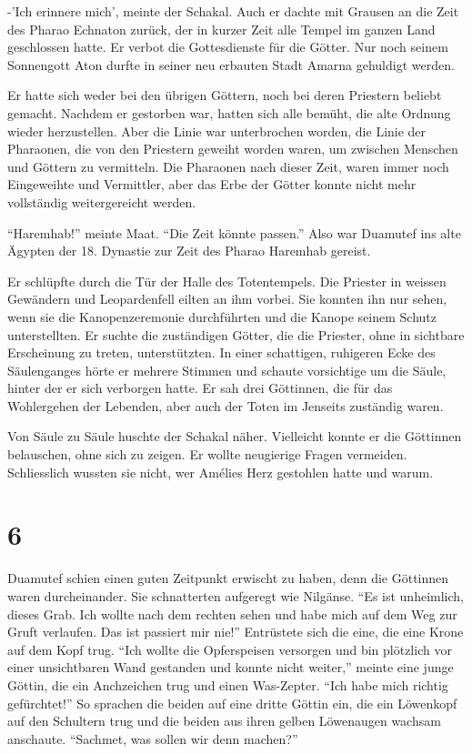 \documentclass[11pt,titlepage,a5paper]{book}
\begin{document}
-'Ich erinnere mich', meinte der Schakal. Auch er dachte mit Grausen an die Zeit des Pharao Echnaton zurück, der in kurzer Zeit alle Tempel im ganzen Land geschlossen hatte. Er verbot die Gottesdienste für die Götter. Nur noch seinem Sonnengott Aton durfte in seiner neu erbauten Stadt Amarna gehuldigt werden.

Er hatte sich weder bei den übrigen Göttern, noch bei deren Priestern beliebt gemacht. Nachdem er gestorben war, hatten sich alle bemüht, die alte Ordnung wieder herzustellen. Aber die Linie war unterbrochen worden, die Linie der Pharaonen, die von den Priestern geweiht worden waren, um zwischen Menschen und Göttern zu vermitteln. Die Pharaonen nach dieser Zeit, waren immer noch Eingeweihte und Vermittler, aber das Erbe der Götter konnte nicht mehr vollständig weitergereicht werden. 

"`Haremhab!"' meinte Maat. "`Die Zeit könnte passen."' Also war Duamutef ins alte Ägypten der 18. Dynastie zur Zeit des Pharao Haremhab gereist. 

Er schlüpfte durch die Tür der Halle des Totentempels. Die Priester in weissen Gewändern und Leopardenfell eilten an ihm vorbei. Sie konnten ihn nur sehen, wenn sie die Kanopenzeremonie durchführten und die Kanope seinem Schutz unterstellten. Er suchte die zuständigen Götter, die die Priester, ohne in sichtbare Erscheinung zu treten, unterstützten. In einer schattigen, ruhigeren Ecke des Säulenganges hörte er mehrere Stimmen und schaute vorsichtige um die Säule, hinter der er sich verborgen hatte. Er sah drei Göttinnen, die für das Wohlergehen der Lebenden, aber auch der Toten im Jenseits zuständig waren.

Von Säule zu Säule huschte der Schakal näher. Vielleicht konnte er die Göttinnen belauschen, ohne sich zu zeigen. Er wollte neugierige Fragen vermeiden. Schliesslich wussten sie nicht, wer Amélies Herz gestohlen hatte und warum.

\section*{6}

Duamutef schien einen guten Zeitpunkt erwischt zu haben, denn die Göttinnen waren durcheinander. Sie schnatterten aufgeregt wie Nilgänse. "`Es ist unheimlich, dieses Grab. Ich wollte nach dem rechten sehen und habe mich auf dem Weg zur Gruft verlaufen. Das ist passiert mir nie!"' Entrüstete sich die eine, die eine Krone auf dem Kopf trug. "`Ich wollte die Opferspeisen versorgen und bin plötzlich vor einer unsichtbaren Wand gestanden und konnte nicht weiter,"' meinte eine junge Göttin, die ein Anchzeichen trug und einen Was-Zepter. "`Ich habe mich richtig gefürchtet!"' So sprachen die beiden auf eine dritte Göttin ein, die ein Löwenkopf auf den Schultern trug und die beiden aus ihren gelben Löwenaugen wachsam anschaute. "`Sachmet, was sollen wir denn machen?"' 
\end{document}
